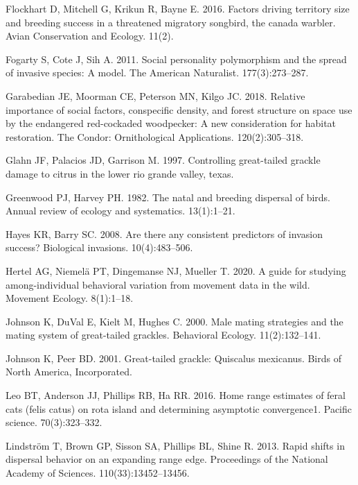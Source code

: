 \documentclass[
]{article}
\begin{document}
\leavevmode\hypertarget{ref-flockhart2016factors}{}%
Flockhart D, Mitchell G, Krikun R, Bayne E. 2016. Factors driving
territory size and breeding success in a threatened migratory songbird,
the canada warbler. Avian Conservation and Ecology. 11(2).

\leavevmode\hypertarget{ref-fogarty2011social}{}%
Fogarty S, Cote J, Sih A. 2011. Social personality polymorphism and the
spread of invasive species: A model. The American Naturalist.
177(3):273--287.

\leavevmode\hypertarget{ref-garabedian2018relative}{}%
Garabedian JE, Moorman CE, Peterson MN, Kilgo JC. 2018. Relative
importance of social factors, conspecific density, and forest structure
on space use by the endangered red-cockaded woodpecker: A new
consideration for habitat restoration. The Condor: Ornithological
Applications. 120(2):305--318.

\leavevmode\hypertarget{ref-glahn1997controlling}{}%
Glahn JF, Palacios JD, Garrison M. 1997. Controlling great-tailed
grackle damage to citrus in the lower rio grande valley, texas.

\leavevmode\hypertarget{ref-greenwood1982natal}{}%
Greenwood PJ, Harvey PH. 1982. The natal and breeding dispersal of
birds. Annual review of ecology and systematics. 13(1):1--21.

\leavevmode\hypertarget{ref-hayes2008there}{}%
Hayes KR, Barry SC. 2008. Are there any consistent predictors of
invasion success? Biological invasions. 10(4):483--506.

\leavevmode\hypertarget{ref-hertel2020guide}{}%
Hertel AG, Niemelä PT, Dingemanse NJ, Mueller T. 2020. A guide for
studying among-individual behavioral variation from movement data in the
wild. Movement Ecology. 8(1):1--18.

\leavevmode\hypertarget{ref-johnson2000male}{}%
Johnson K, DuVal E, Kielt M, Hughes C. 2000. Male mating strategies and
the mating system of great-tailed grackles. Behavioral Ecology.
11(2):132--141.

\leavevmode\hypertarget{ref-johnson2001great}{}%
Johnson K, Peer BD. 2001. Great-tailed grackle: Quiscalus mexicanus.
Birds of North America, Incorporated.

\leavevmode\hypertarget{ref-leo2016home}{}%
Leo BT, Anderson JJ, Phillips RB, Ha RR. 2016. Home range estimates of
feral cats (felis catus) on rota island and determining asymptotic
convergence1. Pacific science. 70(3):323--332.

\leavevmode\hypertarget{ref-lindstrom2013rapid}{}%
Lindström T, Brown GP, Sisson SA, Phillips BL, Shine R. 2013. Rapid
shifts in dispersal behavior on an expanding range edge. Proceedings of
the National Academy of Sciences. 110(33):13452--13456.
\end{document}
